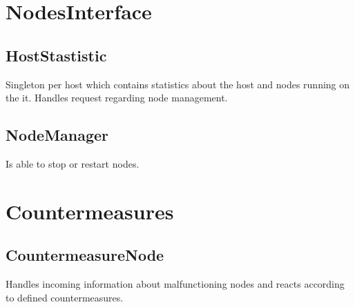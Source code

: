 \section{NodesInterface}

\subsection{HostStastistic}
Singleton per host which contains statistics about the host and nodes running on the it. Handles request regarding node management.

\subsection{NodeManager}
Is able to stop or restart nodes.


\section{Countermeasures}




\subsection{CountermeasureNode}
Handles incoming information about malfunctioning nodes and reacts according to defined countermeasures.



\newpage
